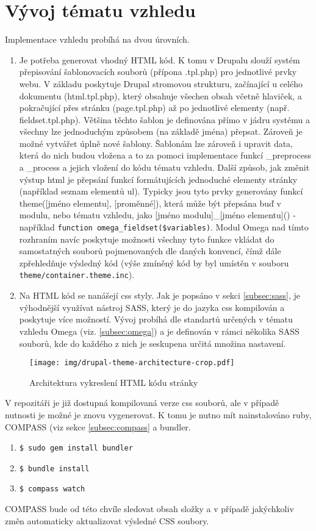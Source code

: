 \section{Vývoj tématu vzhledu}
Implementace vzhledu probíhá na dvou úrovních. 
\begin{enumerate}
  \item Je potřeba generovat vhodný HTML kód. K tomu v Drupalu slouží systém přepisování šablonovacích souborů (přípona .tpl.php) pro jednotlivé prvky webu. V základu poskytuje Drupal stromovou strukturu, začínající u celého dokumentu (html.tpl.php), který obsahuje všechen obsah včetně hlaviček, a pokračující přes stránku (page.tpl.php) až po jednotlivé elementy (např. fieldset.tpl.php). Většina těchto šablon je definována přímo v jádru systému a všechny lze jednoduchým způsobem (na základě jména) přepsat. Zároveň je možné vytvářet úplně nové šablony. Šablonám lze zároveň i upravit data, která do nich budou vložena a to za pomoci implementace funkcí \_preprocess a \_process a jejich vložení do kódu tématu vzhledu. 
  Další způsob, jak změnit výstup html je přepsání funkcí formátujících jednoduché elementy stránky (například seznam elementů ul). Typicky jsou tyto prvky generovány funkcí theme([jméno elementu], [proměnné]), která může být přepsána buď v modulu, nebo tématu vzhledu, jako [jméno modulu]\_[jméno elementu]() - například \texttt{function omega\_fieldset(\$variables)}. Modul Omega nad tímto rozhraním navíc poskytuje možnosti všechny tyto funkce vkládat do samostatných souborů pojmenovaných dle daných konvencí, čímž dále zpřehledňuje výsledný kód (výše zmíněný kód by byl umístěn v souboru \texttt{theme/container.theme.inc}).
  \item Na HTML kód se nanášejí \gls{css} styly. Jak je popsáno v sekci \ref{subsec:sass}, je výhodnější využívat nástroj SASS, který je do jazyka \gls{css} kompilován a poskytuje více možností. Vývoj probíhá dle standartů určených v tématu vzhledu Omega (viz. \ref{subsec:omega}) a je definován v rámci několika SASS souborů, kde do každého z nich je seskupena určitá množina nastavení.
\end{enumerate}

\begin{figure}[]
  \texttt{[image: img/drupal-theme-architecture-crop.pdf]}
  \caption{Architektura vykreslení HTML kódu stránky}
  \label{fig:theme_architecture}
\end{figure}  

V repozitáři je již dostupná kompilovaná verze \gls{css} souborů, ale v případě nutnosti je možné je znovu vygenerovat. K tomu je nutno mít nainstalováno \gls{ruby}, COMPASS (viz sekce \ref{subsec:compass} a \gls{bundler}.

\begin{enumerate}
  \item \texttt{\$ sudo gem install bundler}
  \item \texttt{\$ bundle install}
  \item \texttt{\$ compass watch}
\end{enumerate}

COMPASS bude od této chvíle sledovat obsah složky a v případě jakýchkoliv změn automaticky aktualizovat výsledné CSS soubory.
